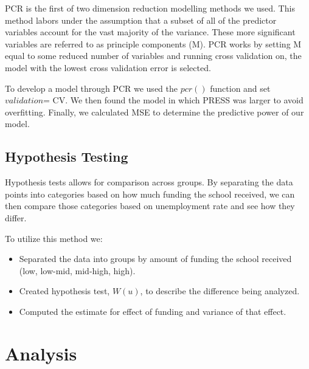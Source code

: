 \documentclass{article}\usepackage[]{graphicx}\usepackage[]{color}
\begin{document}
PCR is the first of two dimension reduction modelling methods we used.  This method labors under the assumption that a subset of all of the predictor variables account for the vast majority of the variance.  These more significant variables are referred to as principle components (M).  PCR works by setting M equal to some reduced number of variables and running cross validation on, the model with the lowest cross validation error is selected.

To develop a model through PCR we used the $pcr()$ function and set $validation$= CV.  We then found the model in which PRESS was larger to avoid overfitting. Finally, we calculated MSE to determine the predictive power of our model.

\subsection{Hypothesis Testing}

Hypothesis tests allows for comparison across groups. By separating the data points into categories based on how much funding the school received, we can then compare those categories based on unemployment rate and see how they differ.


To utilize this method we:
\begin{itemize}
\item Separated the data into groups by amount of funding the school received (low, low-mid, mid-high, high). 
\item Created hypothesis test, $W(u)$, to describe the difference being analyzed.
\item Computed the estimate for effect of funding and variance of that effect.
\end{itemize}

\maketitle
\section{Analysis}
\end{document}
